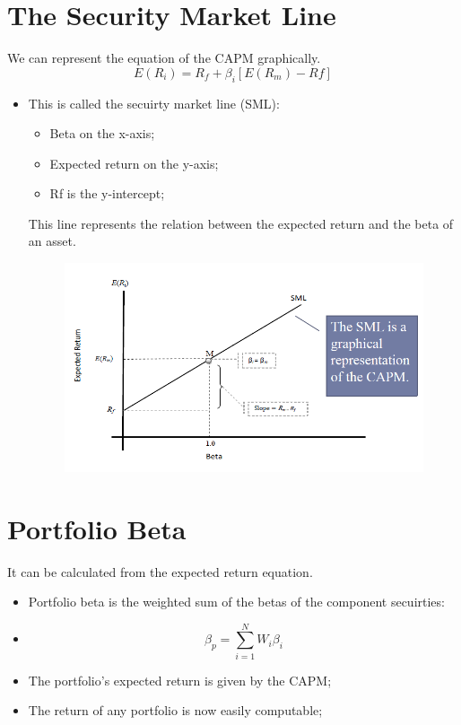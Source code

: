 \documentclass[11pt,a4paper]{report}
\begin{document}
\section{The Security Market Line}
We can represent the equation of the CAPM graphically.
\[E(R_i) = R_f + \beta_i[E(R_m)-Rf]\]
\begin{itemize}
    \item This is called the secuirty market line (SML):
    \begin{itemize}
        \item Beta on the x-axis;
        \item Expected return on the y-axis;
        \item Rf is the y-intercept;
    \end{itemize}
    This line represents the relation between the expected return and the beta of an asset.
    \begin{figure}[h]
        \centering
        \includegraphics[width=\textwidth]{images/sml.png}
    \end{figure}
\end{itemize}
\section{Portfolio Beta}
It can be calculated from the expected return equation.
\begin{itemize}
    \item Portfolio beta is the weighted sum of the betas of the component secuirties:
    \item \[ \beta_p = \sum_{i=1}^{N}W_i\beta_i \]
    \item The portfolio's expected return is given by the CAPM;
    \item The return of any portfolio is now easily computable;
\end{itemize}
\end{document}

